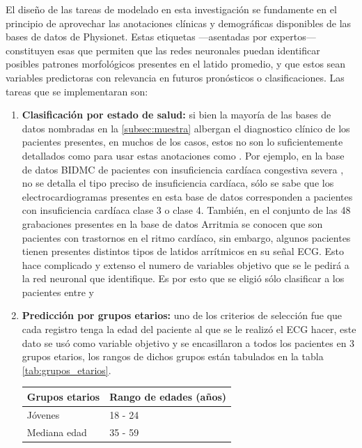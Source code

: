 \documentclass[12pt,letterpaper,oneside,openright]{book}
\begin{document}
El diseño de las tareas de modelado en esta investigación se fundamente en el principio de aprovechar las anotaciones clínicas y demográficas disponibles de las bases de datos de Physionet. Estas etiquetas ---asentadas por expertos--- constituyen esas  que permiten que las redes neuronales puedan identificar posibles patrones morfológicos presentes en el latido promedio, y que estos sean variables predictoras con relevancia en futuros pronósticos o clasificaciones. Las tareas que se implementaran son:
\begin{enumerate}
	\item \label{item:clasificacion_salud} \textbf{Clasificación por estado de salud:} si bien la mayoría de las bases de datos nombradas en la \ref{subsec:muestra} albergan el diagnostico clínico de los pacientes presentes, en muchos de los casos, estos no son lo suficientemente detallados como para usar estas anotaciones como . Por ejemplo, en la base de datos BIDMC de pacientes con insuficiencia cardíaca congestiva severa \cite{InsuficienciaCardiacaDB}, no se detalla el tipo preciso de insuficiencia cardíaca, sólo se sabe que los electrocardiogramas presentes en esta base de datos corresponden a pacientes con insuficiencia cardíaca clase 3 o clase 4. También, en el conjunto de las 48 grabaciones presentes en la base de datos Arritmia \cite{arritmiadb} se conocen que son pacientes con trastornos en el ritmo cardíaco, sin embargo, algunos pacientes tienen presentes distintos tipos de latidos arrítmicos en su señal ECG. Esto hace complicado y extenso el numero de variables objetivo que se le pedirá a la red neuronal que identifique. Es por esto que se eligió sólo clasificar a los pacientes entre  y 
	\item \textbf{Predicción por grupos etarios:} uno de los criterios de selección fue que cada registro tenga la edad del paciente al que se le realizó el ECG hacer, este dato se usó como variable objetivo y se encasillaron a todos los pacientes en 3 grupos etarios, los rangos de dichos grupos están tabulados en la tabla \ref{tab:grupos_etarios}.
	\begin{table}[h]
		\begin{center}
			\begin{tabular}{| M{3cm} | M{2cm} |}
				\hline
				\textbf{Grupos etarios} & \textbf{Rango de edades (años)} \\ \hline
				Jóvenes & 18 - 24 \\ \hline
				Mediana edad & 35 - 59 \\ \hline

\end{tabular}
\end{center}
\end{table}
\end{enumerate}
\end{document}
